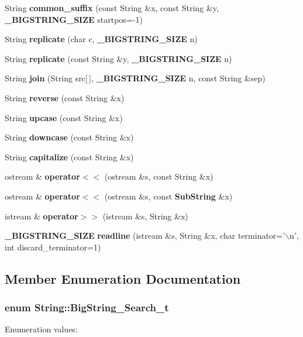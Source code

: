 \begin{CompactItemize}
\item 
String {\bf common\_\-suffix} (const String \&x, const String \&y, {\bf \_\-BIGSTRING\_\-SIZE} startpos=-1)
\item 
String {\bf replicate} (char c, {\bf \_\-BIGSTRING\_\-SIZE} n)
\item 
String {\bf replicate} (const String \&y, {\bf \_\-BIGSTRING\_\-SIZE} n)
\item 
String {\bf join} (String src[$\,$], {\bf \_\-BIGSTRING\_\-SIZE} n, const String \&sep)
\item 
String {\bf reverse} (const String \&x)
\item 
String {\bf upcase} (const String \&x)
\item 
String {\bf downcase} (const String \&x)
\item 
String {\bf capitalize} (const String \&x)
\item 
ostream \& {\bf operator$<$$<$} (ostream \&s, const String \&x)
\item 
ostream \& {\bf operator$<$$<$} (ostream \&s, const {\bf Sub\-String} \&x)
\item 
istream \& {\bf operator$>$$>$} (istream \&s, String \&x)
\item 
{\bf \_\-BIGSTRING\_\-SIZE} {\bf readline} (istream \&s, String \&x, char terminator='$\backslash$n', int discard\_\-terminator=1)
\end{CompactItemize}


\subsection{Member Enumeration Documentation}
\subsubsection{\setlength{\rightskip}{0pt plus 5cm}enum String::Big\-String\_\-Search\_\-t}\label{classString_s2}


\begin{Desc}
\item[Enumeration values:]\par
\begin{description}
\item[{\em 
{\em SEARCH\_\-START}\label{classString_s2s0}
}]\item[{\em 
{\em SEARCH\_\-END}\label{classString_s2s1}
}]\end{description}
\end{Desc}



